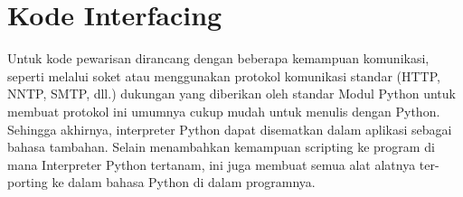 \documentclass[12pt, times new roman, a4paper]{article}
\begin{document}
\section{Kode Interfacing}
Untuk kode pewarisan dirancang dengan beberapa kemampuan komunikasi, seperti melalui soket atau
menggunakan protokol komunikasi standar (HTTP, NNTP, SMTP, dll.) dukungan yang diberikan oleh standar
Modul Python untuk membuat protokol ini umumnya cukup mudah untuk menulis dengan Python.
Sehingga akhirnya, interpreter Python dapat disematkan dalam aplikasi sebagai bahasa tambahan. Selain menambahkan kemampuan scripting ke program di mana Interpreter Python tertanam, ini juga membuat semua alat alatnya ter-porting ke dalam bahasa Python di dalam programnya.
\end{document}
